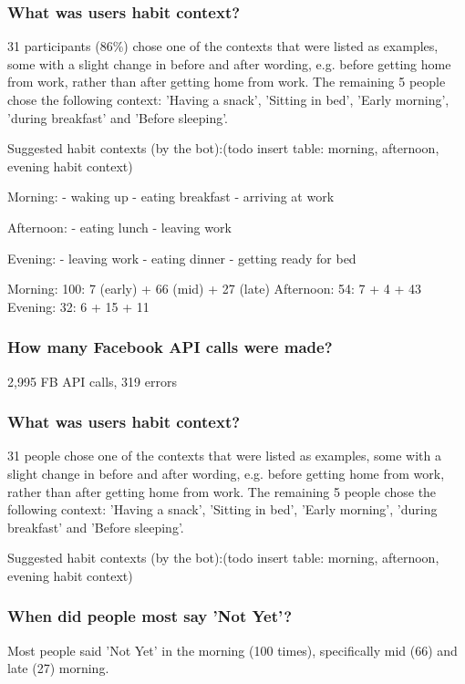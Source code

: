 \subsubsection*{What was users habit context?}
31 participants (86\%) chose one of the contexts that were listed as examples, some with a slight change in before and after wording, e.g. before getting home from work, rather than after getting home from work. The remaining 5 people chose the following context: 'Having a snack', 'Sitting in bed', 'Early morning', 'during breakfast' and 'Before sleeping'.

Suggested habit contexts (by the bot):(todo insert table: morning, afternoon, evening habit context)

Morning:
  - waking up
  - eating breakfast
  - arriving at work

  Afternoon:
  - eating lunch
  - leaving work

  Evening:
  - leaving work
  - eating dinner
  - getting ready for bed

  Morning: 100: 7 (early) + 66 (mid) + 27 (late)
  Afternoon: 54: 7 + 4 + 43
  Evening: 32: 6 + 15 + 11




\subsubsection*{How many Facebook API calls were made?}
2,995 FB API calls, 319 errors

\subsubsection*{What was users habit context?}
31 people chose one of the contexts that were listed as examples, some with a slight change in before and after wording, e.g. before getting home from work, rather than after getting home from work. The remaining 5 people chose the following context: 'Having a snack', 'Sitting in bed', 'Early morning', 'during breakfast' and 'Before sleeping'.

Suggested habit contexts (by the bot):(todo insert table: morning, afternoon, evening habit context)





\subsubsection*{When did people most say 'Not Yet'?}
Most people said 'Not Yet' in the morning (100 times), specifically mid (66) and late (27) morning.

